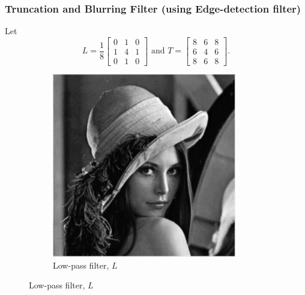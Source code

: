 \documentclass{beamer}
\begin{document}
\begin{frame}
\frametitle{Truncation and Blurring Filter (using Edge-detection filter)}
Let $$L=
\frac{1}{8}
\begin{bmatrix}
0 & 1 & 0\\
1 & 4 & 1\\
0 & 1 & 0
\end{bmatrix} \mbox{ and } T=\left[
\begin{array}{ccc}
8 & 6 & 8 \\
6 & 4 & 6 \\
8 & 6 & 8
\end{array}
\right].$$

\begin{figure}[h] \centering 
\begin{subfigure}[b]{0.3\textwidth} \includegraphics[width=\textwidth]{LPF.png} \caption{Low-pass filter, $L$} \end{subfigure}

\end{figure}
\end{frame}
\end{document}
